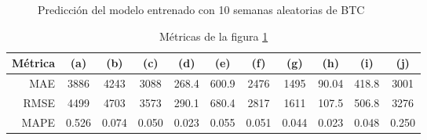 \documentclass[a4paper,10pt]{article}
\begin{document}
\begin{figure}[H]
    \\
    \\
  \caption{Predicción del modelo entrenado con 10 semanas aleatorias de BTC}
  \label{f:btc_wk_arima}
\end{figure}

\begin{table}[H]
 \begin{center}
 \resizebox{12cm}{!} {
  \begin{tabular}{|r|c|c|c|c|c|c|c|c|c|c|}
    Métrica & (a) & (b) & (c) & (d) & (e) & (f) & (g) & (h) & (i) & (j) \\ \hline
    MAE & 3886 & 4243 & 3088 & 268.4 & 600.9 & 2476 & 1495 & 90.04 & 418.8 & 3001 \\
    RMSE & 4499 & 4703 & 3573 & 290.1 & 680.4 & 2817 & 1611 & 107.5 & 506.8 & 3276 \\
    MAPE & 0.526 & 0.074 & 0.050 & 0.023 & 0.055 & 0.051 & 0.044 & 0.023 & 0.048 & 0.250 \\ \hline
  \end{tabular}
  }
  \caption{Métricas de la figura \ref{f:btc_wk_arima}}
  \label{tab:btc}
 \end{center}
\end{table}
\end{document}
